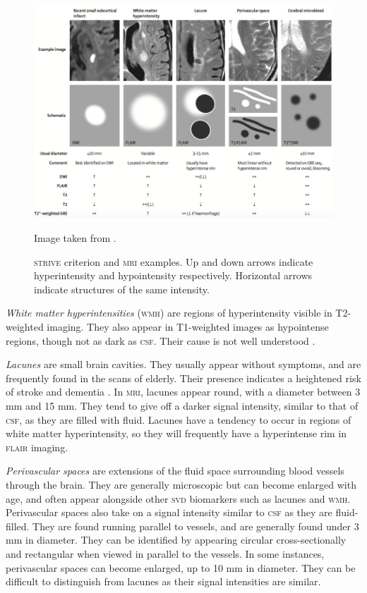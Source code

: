 \begin{figure}[ht]
	\centering
	\includegraphics[width = \textwidth]{Images/2_STRIVE.png}
	\caption{\textsc{strive} criterion and \textsc{mri} examples. Up and down arrows indicate hyperintensity and hypointensity respectively. Horizontal arrows indicate structures of the same intensity.}
	\small Image taken from \cite{WardlawJ.M.2013Nsfr}.
	\label{svd-biomarkers-fig}
\end{figure}

\textit{White matter hyperintensities} (\textsc{wmh}) are regions of hyperintensity visible in T2-weighted imaging. They also appear in T1-weighted images as hypointense regions, though not as dark as \textsc{csf}. Their cause is not well understood \cite{Gouw2011}.

\textit{Lacunes} are small brain cavities. They usually appear without symptoms, and are frequently found in the scans of elderly. Their presence indicates a heightened risk of stroke and dementia \cite{BenjaminJ.Philip2018LIbN, VanDerFlierM.Wiesje2005SVDa}. In \textsc{mri}, lacunes appear round, with a diameter between 3 mm and 15 mm. They tend to give off a darker signal intensity, similar to that of \textsc{csf}, as they are filled with fluid. Lacunes have a tendency to occur in regions of white matter hyperintensity, so they will frequently have a hyperintense rim in \textsc{flair} imaging.

\textit{Perivascular spaces} are extensions of the fluid space surrounding blood vessels through the brain. They are generally microscopic but can become enlarged with age, and often appear alongside other \textsc{svd} biomarkers such as lacunes and \textsc{wmh}. Perivascular spaces also take on a signal intensity similar to \textsc{csf} as they are fluid-filled. They are found running parallel to vessels, and are generally found under 3 mm in diameter. They can be identified by appearing circular cross-sectionally and rectangular when viewed in parallel to the vessels. In some instances, perivascular spaces can become enlarged, up to 10 mm in diameter. They can be difficult to distinguish from lacunes as their signal intensities are similar.

